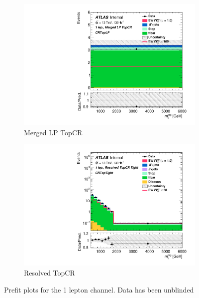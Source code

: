 \begin{figure}[ht]
\begin{subfigure}[b]{0.32\textwidth}
        \includegraphics[width=\textwidth]{figures/FitResults/prefit/Region_disttagMjj_DCRTopLP_BMin0_J0_incJet1_L1_T0_incFat1_Y6051_incTag1_Fat1_Prefit.pdf}
        \caption{Merged LP TopCR}
    \end{subfigure}
    \begin{subfigure}[b]{0.32\textwidth}
        \includegraphics[width=\textwidth]{figures/FitResults/prefit/Region_disttagMjj_DCRTopTight_BMin0_T0_Y6051_incTag1_J2_L1_incJet1_Prefitlog.pdf}
        \caption{Resolved TopCR}
    \end{subfigure}
    \caption{Prefit plots for the 1 lepton channel. Data has been unblinded}
    \label{fig:fit_1lep_prefit}
\end{figure}




